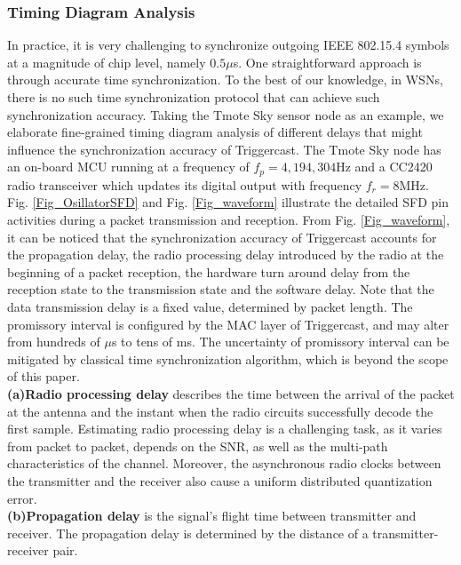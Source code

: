 \documentclass[conference]{IEEEtran}
\begin{document}
\subsubsection{Timing Diagram Analysis}
\label{Sec_TimingAnalysis}
\indent In practice, it is very challenging to synchronize outgoing IEEE 802.15.4 symbols at a magnitude of chip level, namely $0.5\mu$s.
One straightforward approach is through accurate time synchronization.
To the best of our knowledge, in WSNs, there is no such time synchronization protocol \cite{MarotiSensys2004FTSP} that can achieve such synchronization accuracy.
Taking the Tmote Sky sensor node as an example, we elaborate fine-grained timing diagram analysis of different delays that might influence the synchronization accuracy of Triggercast.
The Tmote Sky node has an on-board MCU running at a frequency of $f_p=4,194,304$Hz and a CC2420 radio transceiver which updates its digital output with frequency $f_r=8$MHz.\\
\indent  Fig. \ref{Fig_OsillatorSFD} and Fig. \ref{Fig_waveform} illustrate the detailed SFD pin activities during a packet transmission and reception.
From Fig. \ref{Fig_waveform}, it can be noticed that the synchronization accuracy of Triggercast accounts for the propagation delay, the radio processing delay introduced by the radio at the beginning of a packet reception, the hardware turn around delay from the reception state to the transmission state and the software delay. Note that the data transmission delay is a fixed value, determined by packet length. The promissory interval is configured by the MAC layer of Triggercast, and may alter from hundreds of $\mu$s to tens of ms. The uncertainty of promissory interval can be mitigated by classical time synchronization algorithm, which is beyond the scope of this paper.\\
\indent \textbf{(a)Radio processing delay} describes the time between the arrival of the packet at the antenna and the instant when the radio circuits successfully decode the first sample.
Estimating radio processing delay is a challenging task, as it varies from packet to packet, depends on the SNR, as well as the multi-path characteristics of the channel.
Moreover, the asynchronous radio clocks between the transmitter and the receiver also cause a uniform distributed quantization error.\\
\indent \textbf{(b)Propagation delay} is the signal's flight time between transmitter and receiver.
The propagation delay is determined by the distance of a transmitter-receiver pair.\\
\end{document}

